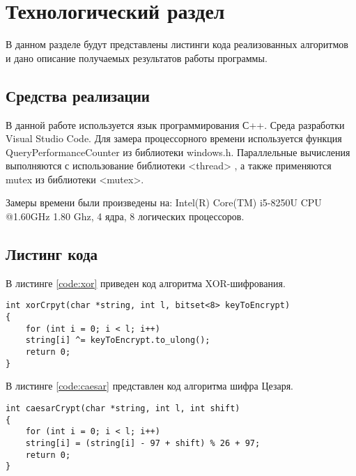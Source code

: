 \chapter{Технологический раздел}
\label{cha:impl}
В данном разделе будут представлены листинги кода реализованных алгоритмов и дано описание получаемых результатов работы программы.

\section{Средства реализации}
\label{sec:realisation}
В данной работе используется язык программирования С++. Среда разработки Visual Studio Code. Для замера процессорного времени используется функция QueryPerformanceCounter из библиотеки windows.h. Параллельные вычисления выполняются с использование библиотеки <thread> \cite{threads}, а также применяются mutex из библиотеки <mutex>.
\par Замеры времени были произведены на: Intel(R) Core(TM) i5-8250U CPU @1.60GHz 1.80 Ghz, 4 ядра, 8 логических процессоров.

\section{Листинг кода}
\label{sec:listings}
В листинге \ref{code:xor} приведен код алгоритма XOR-шифрования.
\begin{lstlisting}[caption= Алгоритм XOR-шифра, label=code:xor]
int xorCrpyt(char *string, int l, bitset<8> keyToEncrypt)
{
	for (int i = 0; i < l; i++)
	string[i] ^= keyToEncrypt.to_ulong();
	return 0;
}
\end{lstlisting}

\par В листинге \ref{code:caesar} представлен код алгоритма шифра Цезаря.
\begin{lstlisting}[caption= Алгоритм шифра Цезаря, label=code:caesar]
int caesarCrypt(char *string, int l, int shift)
{
	for (int i = 0; i < l; i++)
	string[i] = (string[i] - 97 + shift) % 26 + 97;
	return 0;
}
\end{lstlisting}

